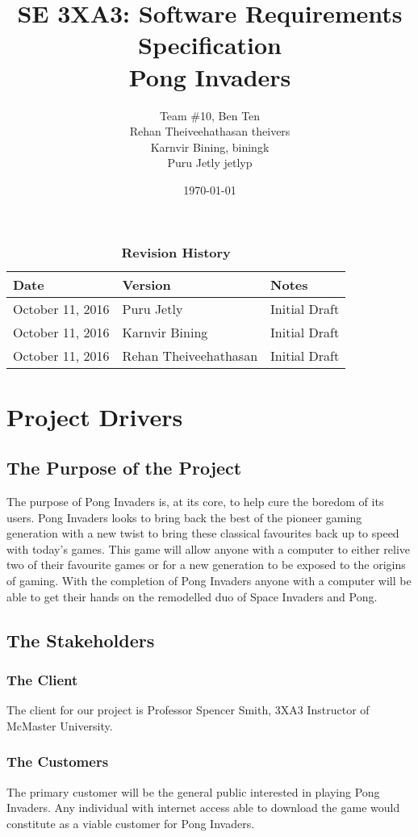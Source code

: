 \documentclass[12pt, titlepage]{article}
\title{SE 3XA3: Software Requirements Specification\\Pong Invaders}
\author{Team \#10, Ben Ten
		\\ Rehan Theiveehathasan theivers
		\\ Karnvir Bining, biningk 
		\\ Puru Jetly jetlyp
}
\date{\today}
\begin{document}
\maketitle
{}
\tableofcontents
\listoftables
\listoffigures
\begin{table}[bp]
\caption{\bf Revision History}
\begin{tabularx}{\textwidth}{p{3cm}p{2cm}X}
\toprule {\bf Date} & {\bf Version} & {\bf Notes}\\
\midrule
October 11, 2016  & Puru Jetly & Initial Draft\\
October 11, 2016  & Karnvir Bining & Initial Draft\\
October 11, 2016  & Rehan Theiveehathasan & Initial Draft\\
\bottomrule
\end{tabularx}
\end{table}
\newpage
{}
\section{Project Drivers}
\subsection{The Purpose of the Project}
The purpose of Pong Invaders is, at its core, to help cure the boredom of its users. Pong Invaders looks to bring back the best of the pioneer gaming generation with a new twist to bring these classical favourites back up to speed with today’s games. This game will allow anyone with a computer to either relive two of their favourite games or for a new generation to be exposed to the origins of gaming. With the completion of Pong Invaders anyone with a computer will be able to get their hands on the remodelled duo of Space Invaders and Pong.     
\subsection{The Stakeholders}
\subsubsection{The Client}
The client for our project is Professor Spencer Smith, 3XA3 Instructor of McMaster University. 
\subsubsection{The Customers}
The primary customer will be the general public interested in playing Pong Invaders. Any individual with internet access able to download the game would constitute as a viable customer for Pong Invaders. 
\end{document}

